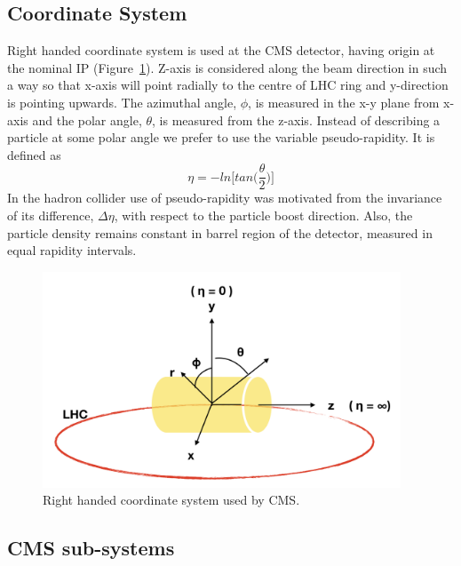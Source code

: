 \subsection{Coordinate System} %
\label{sub:coordinate_system}
Right handed coordinate system is used at the CMS detector, having origin at the nominal IP (Figure~\ref{fig:cms-coordinate-system}). Z-axis is considered along the beam direction in such a way so that x-axis will point radially to the centre of LHC ring and y-direction is pointing upwards. The azimuthal angle, $\phi$, is measured in the x-y plane from x-axis and the polar angle, $\theta$, is measured from the z-axis. Instead of describing a particle at some polar angle we prefer to use the variable pseudo-rapidity. It is defined as 
\begin{equation}
	\eta = -ln\bigg[tan\Big(\frac{\theta}{2}\Big)\bigg]
\end{equation}
In the hadron collider use of pseudo-rapidity was motivated from the invariance of its difference, $\Delta \eta$, with respect to the particle boost direction. Also, the particle density remains constant in barrel region of the detector, measured in equal rapidity intervals.

\begin{figure}[!htbp]
	\centering
	\includegraphics[width=0.95\textwidth]{figures/LHC/CMS-coordinate-system.png}
	\caption{Right handed coordinate system used by CMS.}
	\label{fig:cms-coordinate-system}
\end{figure}

\subsection{CMS sub-systems} %
\label{sub:cms_sub_systems}


